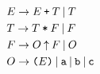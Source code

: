 \textcolor{red}{
\begin{align*}
& E \rightarrow E \: \texttt{+} \: T \: | \: T\\
& T \rightarrow T \: \texttt{*} \: F \: | \: F\\
& F \rightarrow O \: \texttt{$\uparrow$} \: F \: | \: O\\
& O \rightarrow \texttt{(}E\texttt{)} \: | \: \texttt{a} \: | \: \texttt{b} \: | \: \texttt{c}
\end{align*}
}